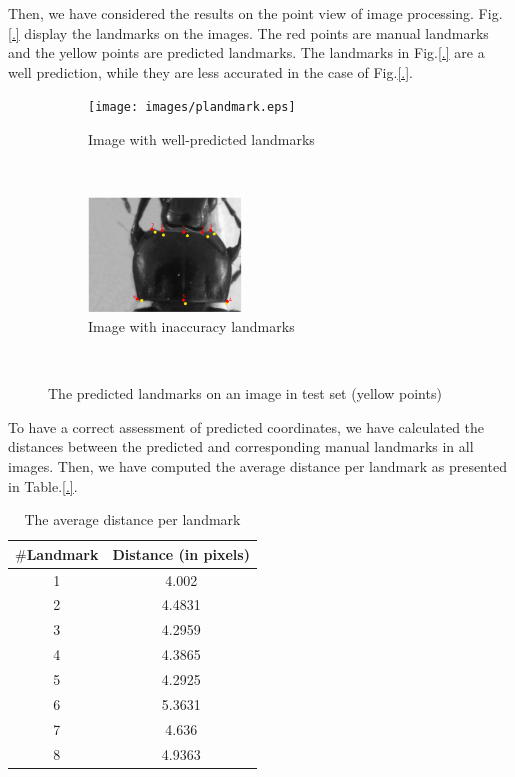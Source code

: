 \documentclass{article} %
\begin{document}
\begin{multicols}{2}
Then, we have considered the results on the point view of image processing. Fig.\ref{.} display the landmarks on the images. The red points are manual landmarks and the yellow points are predicted landmarks. The landmarks in Fig.\ref{.} are a well prediction, while they are less accurated in the case of Fig.\ref{.}.

\begin{figure}[H]
    \centering
    \begin{subfigure}[t]{0.25\textwidth}
        \centering
        \texttt{[image: images/plandmark.eps]}
        \caption{Image with well-predicted landmarks}
        \label{figsub1}
    \end{subfigure}%
    ~ 
    \begin{subfigure}[t]{0.25\textwidth}
        \centering
        \includegraphics[height=1.2in]{images/plandmark2.eps}
        \caption{Image with inaccuracy landmarks}
        \label{figsub2}
    \end{subfigure}
    \caption{The predicted landmarks on an image in test set (yellow points)}\
    \label{figrsexample}
\end{figure}

To have a correct assessment of predicted coordinates, we have calculated the distances between the predicted and corresponding manual landmarks in all images. Then, we have computed the average distance per landmark as presented in Table.\ref{.}.
\begin{table}[H]
	\centering
	\begin{tabular}{|c|c|}
		\hline
		\textbf{$\#$Landmark} & \textbf{Distance} (in pixels) \\ \hline
		1 & 4.002  \\ \hline
		2 & 4.4831 \\ \hline
		3 & 4.2959 \\ \hline
		4 & 4.3865 \\ \hline
		5 & 4.2925 \\ \hline
		6 & 5.3631 \\ \hline
		7 & 4.636 \\ \hline
		8 & 4.9363 \\ \hline
	\end{tabular}
	\label{table2}
	\caption{The average distance per landmark}
\end{table}

\end{multicols}
\end{document}
